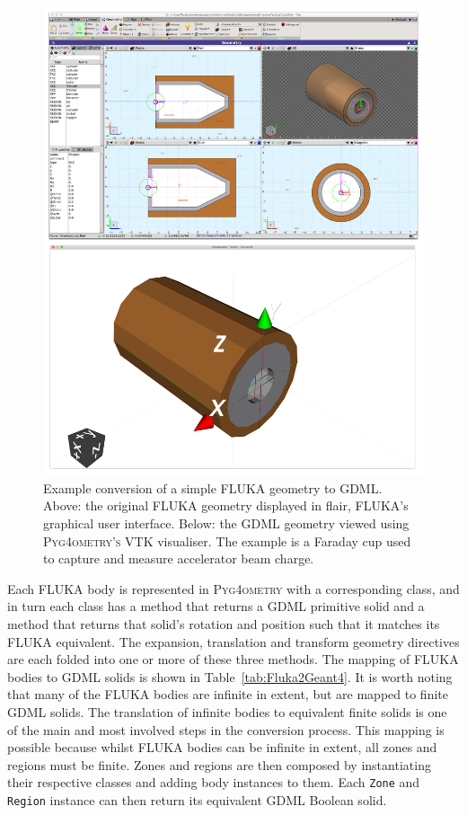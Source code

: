 \documentclass[preprint,12pt]{elsarticle}
\newcommand{\pyinline}[1]{\lstinline[postbreak={}]{#1}}
\newcommand{\PYGEOMETRY}{\textsc{Pyg4ometry}}
\newcommand{\PYGEOMETRYPOS}{\textsc{Pyg4ometry's}} %
\begin{document}
\begin{figure}[htbp]
\begin{center}
\includegraphics[width=0.9\columnwidth]{faradayCup2.pdf}
\caption{Example conversion of a simple FLUKA geometry to GDML. Above:
  the original FLUKA geometry displayed in flair, FLUKA's graphical user interface.
  Below: the GDML geometry viewed using \PYGEOMETRYPOS{} VTK visualiser. The example is a Faraday cup used to capture
and measure accelerator beam charge.}
\label{fig:fluka-to-geant4-cup}
\end{center}
\end{figure}

Each FLUKA body is represented in \PYGEOMETRY{} with a corresponding class,
and in turn each class has a method that returns a GDML primitive solid and
a method that returns that solid's rotation and position such that it
matches its FLUKA equivalent.  The expansion, translation and transform
geometry directives are each folded into one or more of these three
methods.  The mapping of FLUKA bodies to GDML solids is shown in
Table~\ref{tab:Fluka2Geant4}.  It is worth noting that many of the FLUKA
bodies are infinite in extent, but are mapped to finite GDML solids.  The
translation of infinite bodies to equivalent finite solids is one of the
main and most involved steps in the conversion process.  This mapping is
possible because whilst FLUKA bodies can be infinite in extent, all zones
and regions must be finite.  Zones and regions are then composed by
instantiating their respective classes and adding body instances to them.  Each
\pyinline{Zone} and \pyinline{Region} instance can then return its
equivalent GDML Boolean solid.
\end{document}
